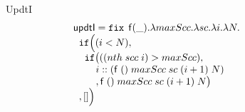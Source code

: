 \documentclass[a4paper,11pt]{article}
\theoremstyle{definition}
\begin{document}
\begin{figure}
UpdtI
\[
\begin{array}{l}
 \mathsf{updtI} = \mathop{\mathtt{fix}} \;  \mathsf{f}(\_). \lambda maxScc. \lambda sc. \lambda
  i. \lambda N. \\
 \hspace{.2cm} \mathtt{if}   \Big (   (i < N)  ,  \\
\hspace{0.4cm}  \mathtt{if} \big( ( ( nth \; scc \; i)  >  maxScc  ) ,       \\
 \hspace{0.8cm}   i :: ( \mathsf{f}  \; () \; maxScc \; sc
  \; (i+1) \; N  )\\
 \hspace{0.8cm} , \mathsf{f}  \; () \; maxScc \; sc
  \; (i+1) \; N  \big )  \\
\hspace{0.2cm}   ,  [] \Big ) \\
 
\end{array}
\]


\end{figure}
\end{document}
